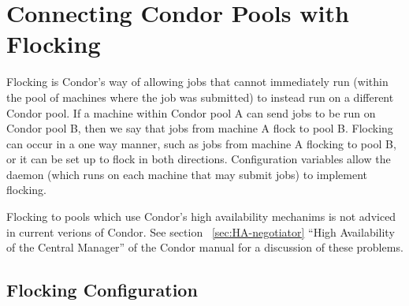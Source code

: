 \section{\label{sec:Flocking}Connecting Condor Pools with Flocking}

Flocking is Condor's way of allowing jobs that cannot immediately
run (within the pool of machines where the job was
submitted) to instead run on a different Condor pool. 
If a machine within Condor pool A can send jobs to be run on Condor pool B,
then we say that jobs from machine A flock to pool B.
Flocking can occur in a one way manner,
such as jobs from machine A flocking to pool B,
or it can be set up to flock in both directions. 
Configuration variables allow the
 daemon (which runs on each machine
that may submit jobs) to implement flocking.

\Note Flocking to pools which use Condor's high availability mechanims
is not adviced in current verions of Condor.  See section
~\ref{sec:HA-negotiator} ``High Availability of the Central Manager''
of the Condor manual for a discussion of these problems.


\subsection{\label{sec:Configure-Flocking}Flocking Configuration}


